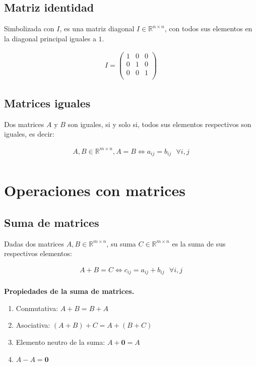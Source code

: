 \documentclass[12pt]{article}
\begin{document}
\subsection{Matriz identidad}
Simbolizada con \(I\),
es una matriz diagonal \(I \in \mathbb{R}^{n \times n}\),
con todos sus elementos en la diagonal principal iguales a \(1\).

\begin{align*}
  I = \begin{pmatrix}
        1 & 0 & 0 \\
        0 & 1 & 0 \\
        0 & 0 & 1 \\
      \end{pmatrix}
\end{align*}


\subsection{Matrices iguales}
Dos matrices \(A\) y \(B\) son iguales,
si y solo si,
todos sus elementos respectivos son iguales,
es decir:

\begin{align*}
  A, B \in \mathbb{R}^{m \times n}, A = B \iff a_{ij} = b_{ij} \text{ } \forall i,j \\
\end{align*}

\section{Operaciones con matrices}

\subsection{Suma de matrices}

Dadas dos matrices \(A, B \in \mathbb{R}^{m \times n}\),
su suma \(C \in \mathbb{R}^{m \times n}\)
es la suma  de sus respectivos elementos:

\begin{align*}
  A + B = C \iff c_{ij} = a_{ij} + b_{ij} \text{ } \forall i,j \\
\end{align*}

\textbf{Propiedades de la suma de matrices.}

\begin{enumerate}
  \item Conmutativa: \(A + B = B + A\)
  \item Asociativa: \((A + B) + C = A + (B + C)\)
  \item Elemento neutro de la suma: \(A + \mathbf{0} = A\)
  \item \(A - A = \mathbf{0}\)
\end{enumerate}
\end{document}
